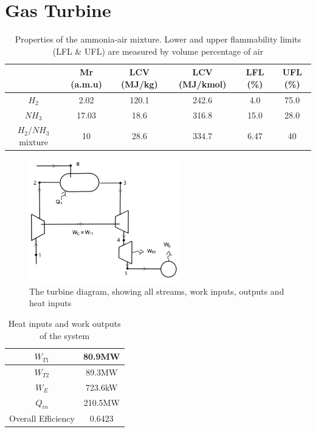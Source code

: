 \documentclass[11pt, oneside]{article}
\begin{document}
\section{Gas Turbine}

\begin{table} [h]
\begin{center}
\caption{Properties of the ammonia-air mixture. Lower and upper flammability limits (LFL \& UFL) are measured by volume percentage of air \cite{FL}} \label{tab:mixproperties}
\begin{tabular}{ |c|c|c|c|c|c| }
 \hline
& Mr (a.m.u) & LCV (MJ/kg) \cite{website:spg}& LCV (MJ/kmol) & LFL (\%)& UFL (\%) \\ 
 \hline
  $H_2$ & 2.02 & 120.1 & 242.6 & 4.0 & 75.0\\ 
 \hline
$NH_3$ & 17.03 & 18.6 & 316.8 & 15.0 & 28.0\\ 
 \hline
$H_2/NH_3$ mixture & 10 & 28.6 & 334.7 & 6.47 & 40\\
 \hline
\end{tabular}
\end{center} 
\end{table}

\begin{figure} [h]
\centering
\includegraphics[width=0.58\textwidth]{./pictures/plantdiagram.png}
  \caption{The turbine diagram, showing all streams, work inputs, outputs and heat inputs} \label{fig:turbinediagram}
  \end{figure}
  
  \begin {table} [h]
\begin{center}
\caption{Heat inputs and work outputs of the system} \label{tab:powerdata} 
\begin{tabular}{ |c|c| }
 \hline
  $W_{T1}$ & 80.9MW\\ 
 \hline
  $W_{T2}$ & 89.3MW\\
  \hline
  $W_E$ & 723.6kW\\
 \hline
 $Q_{in}$ & 210.5MW\\
 \hline
 Overall Efficiency & 0.6423\\ 
 \hline
\end{tabular}
\end{center}  
\end {table}
\end{document}
